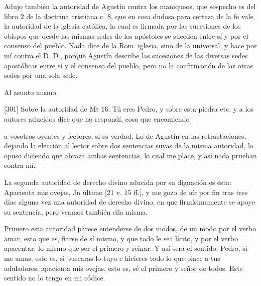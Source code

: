 Adujo también la autoridad de Agustín contra los maniqueos, que sospecho es del libro 2 de la doctrina cristiana c. 8, que en cosa dudosa para certeza de la fe vale la autoridad de la iglesia católica, la cual es firmada por las sucesiones de los obispos que desde las mismas sedes de los apóstoles se suceden entre sí y por el consenso del pueblo. Nada dice de la Rom. iglesia, sino de la universal, y hace por mí contra el D. D., porque Agustín describe las sucesiones de las diversas sedes apostólicas entre sí y el consenso del pueblo, pero no la confirmación de las otras sedes por una sola sede.

Al asunto mismo.

[301] Sobre la autoridad de Mt 16: Tú eres Pedro, y sobre esta piedra etc. y a los autores aducidos dice que no respondí, cosa que encomiendo

a vosotros oyentes y lectores, si es verdad. Lo de Agustín en las retractaciones, dejando la elección al lector sobre dos sentencias suyas de la misma autoridad, lo opuso diciendo que abraza ambas sentencias, lo cual me place, y así nada prueban contra mí.

La segunda autoridad de derecho divino aducida por su dignación es ésta: Apacienta mis ovejas, Jn último [21 v. 15 ff.], y me gozo de oír por fin tras tres días alguna vez una autoridad de derecho divino, en que firmísimamente se apoye su sentencia, pero veamos también ella misma.

Primero esta autoridad parece entenderse de dos modos, de un modo por el verbo amar, esto que es, fiarse de sí mismo, y que todo le sea lícito, y por el verbo apacentar, lo mismo que ser el primero y reinar. Y así será el sentido: Pedro, si me amas, esto es, si buscaras lo tuyo e hicieres todo lo que place a tus aduladores, apacienta mis ovejas, esto es, sé el primero y señor de todos. Este sentido no lo tengo en mi códice.

